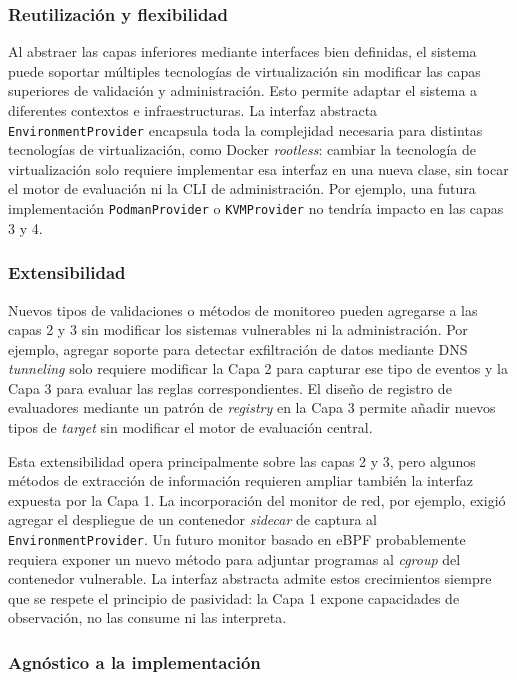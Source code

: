 \subsubsection*{Reutilización y flexibilidad}

Al abstraer las capas inferiores mediante interfaces bien definidas, el sistema
puede soportar múltiples tecnologías de virtualización sin modificar las capas
superiores de validación y administración. Esto permite adaptar el sistema a
diferentes contextos e infraestructuras. La interfaz abstracta
\texttt{EnvironmentProvider} encapsula toda la complejidad necesaria para
distintas tecnologías de virtualización, como Docker \textit{rootless}: cambiar
la tecnología de virtualización solo requiere implementar esa interfaz en una
nueva clase, sin tocar el motor de evaluación ni la CLI de
administración. Por ejemplo, una futura implementación \texttt{PodmanProvider} o
\texttt{KVMProvider} no tendría impacto en las capas 3 y 4.

\subsubsection*{Extensibilidad}

Nuevos tipos de validaciones o métodos de monitoreo pueden agregarse a las capas
2 y 3 sin modificar los sistemas vulnerables ni la administración. Por ejemplo,
agregar soporte para detectar exfiltración de datos mediante DNS
\textit{tunneling} solo requiere modificar la Capa 2 para capturar ese tipo de
eventos y la Capa 3 para evaluar las reglas correspondientes. El diseño de
registro de evaluadores mediante un patrón de \textit{registry} en la Capa 3
permite añadir nuevos tipos de \textit{target} sin modificar el motor de
evaluación central.

Esta extensibilidad opera principalmente sobre las capas 2 y 3, pero algunos
métodos de extracción de información requieren ampliar también la interfaz
expuesta por la Capa 1. La incorporación del monitor de red, por ejemplo, exigió
agregar el despliegue de un contenedor \textit{sidecar} de captura al
\texttt{EnvironmentProvider}. Un futuro monitor basado en eBPF probablemente
requiera exponer un nuevo método para adjuntar programas al \textit{cgroup} del
contenedor vulnerable. La interfaz abstracta admite estos crecimientos siempre
que se respete el principio de pasividad: la Capa 1 expone capacidades de
observación, no las consume ni las interpreta.

\subsubsection*{Agnóstico a la implementación}

